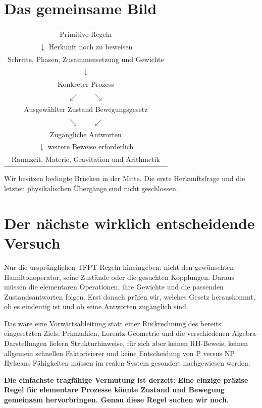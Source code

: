 \section*{Das gemeinsame Bild}
\begin{center}
\begin{tabular}{c}
Primitive Regeln\\
$\downarrow$ \quad Herkunft noch zu beweisen\\
Schritte, Phasen, Zusammensetzung und Gewichte\\
$\downarrow$\\
Konkreter Prozess\\
$\swarrow\qquad\searrow$\\
Ausgewählter Zustand \quad Bewegungsgesetz\\
$\searrow\qquad\swarrow$\\
Zugängliche Antworten\\
$\downarrow$ \quad weitere Beweise erforderlich\\
Raumzeit, Materie, Gravitation und Arithmetik
\end{tabular}
\end{center}
Wir besitzen bedingte Brücken in der Mitte. Die erste Herkunftsfrage und
die letzten physikalischen Übergänge sind nicht geschlossen.

\section*{Der nächste wirklich entscheidende Versuch}
Nur die ursprünglichen TFPT-Regeln hineingeben: nicht den gewünschten
Hamiltonoperator, seine Zustände oder die gesuchten Kopplungen. Daraus
müssen die elementaren Operationen, ihre Gewichte und die passenden
Zustandsantworten folgen. Erst danach prüfen wir, welches Gesetz herauskommt,
ob es eindeutig ist und ob seine Antworten zugänglich sind.

Das wäre eine Vorwärtsableitung statt einer Rückrechnung des bereits
eingesetzten Ziels. Primzahlen, Lorentz-Geometrie und die verschiedenen
Algebra-Darstellungen liefern Strukturhinweise, für sich aber keinen
RH-Beweis, keinen allgemein schnellen Faktorisierer und keine Entscheidung
von P versus NP. Hyl\ae ans Fähigkeiten müssen im realen System gesondert
nachgewiesen werden.

\textbf{Die einfachste tragfähige Vermutung ist derzeit: Eine einzige
präzise Regel für elementare Prozesse könnte Zustand und Bewegung
gemeinsam hervorbringen. Genau diese Regel suchen wir noch.}

